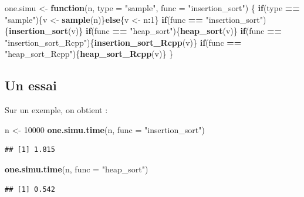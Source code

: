 \documentclass[
]{article}
\newenvironment{Shaded}{\begin{snugshade}}{\end{snugshade}}
\newcommand{\AttributeTok}[1]{\textcolor[rgb]{0.13,0.29,0.53}{#1}}
\newcommand{\ControlFlowTok}[1]{\textcolor[rgb]{0.13,0.29,0.53}{\textbf{#1}}}
\newcommand{\DecValTok}[1]{\textcolor[rgb]{0.00,0.00,0.81}{#1}}
\newcommand{\FunctionTok}[1]{\textcolor[rgb]{0.13,0.29,0.53}{\textbf{#1}}}
\newcommand{\NormalTok}[1]{#1}
\newcommand{\OtherTok}[1]{\textcolor[rgb]{0.56,0.35,0.01}{#1}}
\newcommand{\SpecialCharTok}[1]{\textcolor[rgb]{0.81,0.36,0.00}{\textbf{#1}}}
\newcommand{\StringTok}[1]{\textcolor[rgb]{0.31,0.60,0.02}{#1}}
\begin{document}
\begin{Shaded}
\begin{Highlighting}[]
\NormalTok{one.simu }\OtherTok{\textless{}{-}} \ControlFlowTok{function}\NormalTok{(n, }\AttributeTok{type =} \StringTok{"sample"}\NormalTok{, }\AttributeTok{func =} \StringTok{"insertion\_sort"}\NormalTok{)}
\NormalTok{\{}
  \ControlFlowTok{if}\NormalTok{(type }\SpecialCharTok{==} \StringTok{"sample"}\NormalTok{)\{v }\OtherTok{\textless{}{-}} \FunctionTok{sample}\NormalTok{(n)\}}\ControlFlowTok{else}\NormalTok{\{v }\OtherTok{\textless{}{-}}\NormalTok{ n}\SpecialCharTok{:}\DecValTok{1}\NormalTok{\}}
  \ControlFlowTok{if}\NormalTok{(func }\SpecialCharTok{==} \StringTok{"insertion\_sort"}\NormalTok{)\{}\FunctionTok{insertion\_sort}\NormalTok{(v)\}}
  \ControlFlowTok{if}\NormalTok{(func }\SpecialCharTok{==} \StringTok{"heap\_sort"}\NormalTok{)\{}\FunctionTok{heap\_sort}\NormalTok{(v)\} }
  \ControlFlowTok{if}\NormalTok{(func }\SpecialCharTok{==} \StringTok{"insertion\_sort\_Rcpp"}\NormalTok{)\{}\FunctionTok{insertion\_sort\_Rcpp}\NormalTok{(v)\}}
  \ControlFlowTok{if}\NormalTok{(func }\SpecialCharTok{==} \StringTok{"heap\_sort\_Rcpp"}\NormalTok{)\{}\FunctionTok{heap\_sort\_Rcpp}\NormalTok{(v)\}}
\NormalTok{\}}
\end{Highlighting}
\end{Shaded}

\subsection{Un essai}\label{un-essai}

Sur un exemple, on obtient :

\begin{Shaded}
\begin{Highlighting}[]
\NormalTok{n }\OtherTok{\textless{}{-}} \DecValTok{10000}
\FunctionTok{one.simu.time}\NormalTok{(n, }\AttributeTok{func =} \StringTok{"insertion\_sort"}\NormalTok{)}
\end{Highlighting}
\end{Shaded}

\begin{verbatim}
## [1] 1.815
\end{verbatim}

\begin{Shaded}
\begin{Highlighting}[]
\FunctionTok{one.simu.time}\NormalTok{(n, }\AttributeTok{func =} \StringTok{"heap\_sort"}\NormalTok{)}
\end{Highlighting}
\end{Shaded}

\begin{verbatim}
## [1] 0.542
\end{verbatim}
\end{document}
